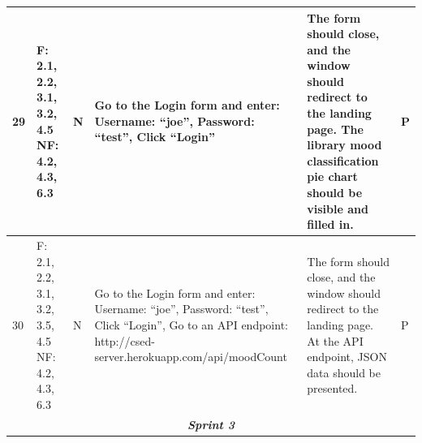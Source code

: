 \documentclass[10pt, notitlepage]{report}
\begin{document}
\begin{longtable}{| p{0.4cm} | p{1.8cm} | p{0.7cm} | p{6.5cm} | p{4.5cm} | p{0.5cm}|}
29&F: 2.1, 2.2, 3.1, 3.2, 4.5 NF: 4.2, 4.3, 6.3&N&Go to the Login form and enter: Username: “joe”, Password: “test”, Click “Login”&The form should close, and the window should redirect to the landing page. The library mood classification pie chart should be visible and filled in.&P\\ \hline
30&F: 2.1, 2.2, 3.1, 3.2, 3.5, 4.5 NF: 4.2, 4.3, 6.3&N&Go to the Login form and enter: Username: “joe”, Password: “test”, Click “Login”, Go to an API endpoint: http://csed-server.herokuapp.com/api/moodCount&The form should close, and the window should redirect to the landing page. At the API endpoint, JSON data should be presented.&P\\ \hline

\multicolumn{6}{|c|}{\textit{\textbf{Sprint 3}}} \\
\hline


\end{longtable}
\end{document}
